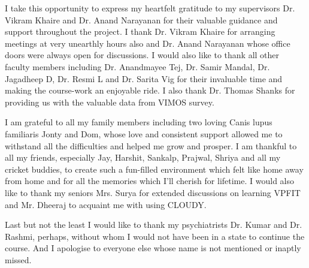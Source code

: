 \begin{ThesisAcknowledgments}

I take this opportunity to express my heartfelt gratitude to my supervisors Dr. Vikram Khaire and Dr. Anand Narayanan for their valuable guidance and support throughout the project. I thank Dr. Vikram Khaire for arranging meetings at very unearthly hours also and Dr. Anand Narayanan whose office doors were always open for discussions. I would also like to thank all other faculty members including Dr. Anandmayee Tej, Dr. Samir Mandal, Dr. Jagadheep D, Dr. Resmi L and Dr. Sarita Vig for their invaluable time and making the course-work an enjoyable ride. I also thank Dr. Thomas Shanks for providing us with the valuable data from VIMOS survey.

I am grateful to all my family members including two loving Canis lupus familiaris Jonty and Dom, whose love and consistent support allowed me to withstand all the difficulties and helped me grow and prosper. I am thankful to all my friends, especially Jay, Harshit, Sankalp, Prajwal, Shriya and all my cricket buddies, to create such a fun-filled environment which felt like home away from home and for all the memories which I'll cherish for lifetime. I would also like to thank my seniors Mrs. Surya for extended discussions on learning VPFIT and Mr. Dheeraj to acquaint me with using CLOUDY. 

Last but not the least I would like to thank my psychiatrists Dr. Kumar and Dr. Rashmi, perhaps, without whom I would not have been in a state to continue the course. And I apologise to everyone else whose name is not mentioned or inaptly missed.

\vspace{25mm}

\hfill \Author

\end{ThesisAcknowledgments}
